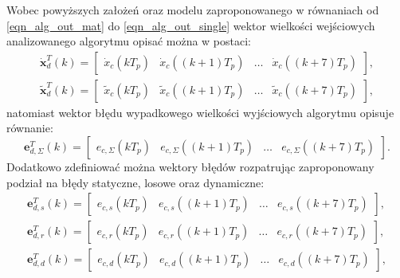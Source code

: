 Wobec powyższych założeń oraz modelu zaproponowanego w równaniach od \eqref{eqn_alg_out_mat} do \eqref{eqn_alg_out_single} wektor wielkości wejściowych analizowanego algorytmu opisać można w postaci:
\begin{gather}
\dot{\mathbf{x}}_{d}^{T}(k) =
\begin{bmatrix}
\dot{x}_{c} \left( kT_{p} \right) & \dot{x}_{c} \left( (k+1) T_{p} \right) & \hdots & \dot{x}_{c} \left( (k+7) T_{p} \right)
\end{bmatrix}
\label{eqn_sym_partd_input_ideal}, \\
\tilde{\mathbf{x}}_{d}^{T}(k) =
\begin{bmatrix}
\tilde{x}_{c} \left( kT_{p} \right) & \tilde{x}_{c} \left( (k+1) T_{p} \right) & \hdots & \tilde{x}_{c} \left( (k+7) T_{p} \right)
\end{bmatrix}
\label{eqn_sym_partd_input_real},
\end{gather}
natomiast wektor błędu wypadkowego wielkości wyjściowych algorytmu opisuje równanie:
\begin{equation}
\mathbf{e}_{d,\Sigma}^{T}(k) =
\begin{bmatrix}
e_{c,\Sigma} \left( kT_{p} \right) & e_{c,\Sigma} \left( (k+1) T_{p} \right) & \hdots & e_{c,\Sigma} \left( (k+7) T_{p} \right)
\end{bmatrix}
\label{eqn_sym_partd_input_error_sum}.
\end{equation}
Dodatkowo zdefiniować można wektory błędów rozpatrując zaproponowany podział na błędy statyczne, losowe oraz dynamiczne:
\begin{gather}
\mathbf{e}_{d,s}^{T}(k) =
\begin{bmatrix}
e_{c,s} \left( kT_{p} \right) & e_{c,s} \left( (k+1) T_{p} \right) & \hdots & e_{c,s} \left( (k+7) T_{p} \right)
\end{bmatrix}
\label{eqn_sym_partd_input_error_stat}, \\
\mathbf{e}_{d,r}^{T}(k) =
\begin{bmatrix}
e_{c,r} \left( kT_{p} \right) & e_{c,r} \left( (k+1) T_{p} \right) & \hdots & e_{c,r} \left( (k+7) T_{p} \right)
\end{bmatrix}
\label{eqn_sym_partd_input_error_rand}, \\
\mathbf{e}_{d,d}^{T}(k) =
\begin{bmatrix}
e_{c,d} \left( kT_{p} \right) & e_{c,d} \left( (k+1) T_{p} \right) & \hdots & e_{c,d} \left( (k+7) T_{p} \right)
\end{bmatrix}
\label{eqn_sym_partd_input_error_dyn},
\end{gather}
